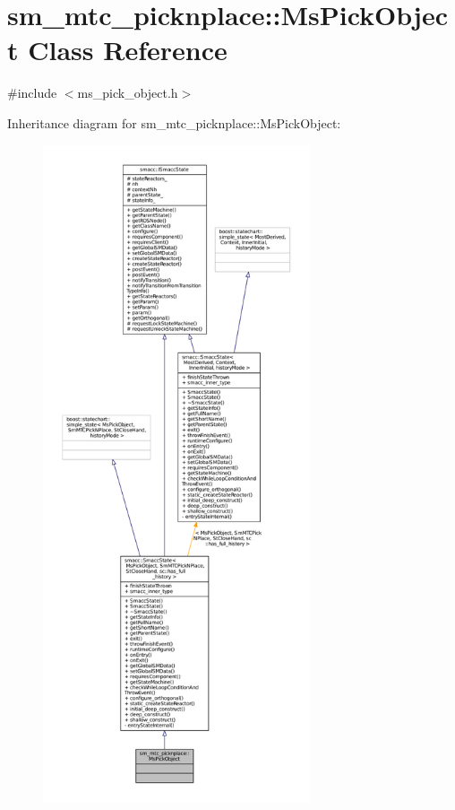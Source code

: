 \hypertarget{classsm__mtc__picknplace_1_1MsPickObject}{}\section{sm\+\_\+mtc\+\_\+picknplace\+:\+:Ms\+Pick\+Object Class Reference}
\label{classsm__mtc__picknplace_1_1MsPickObject}


{\ttfamily \#include $<$ms\+\_\+pick\+\_\+object.\+h$>$}



Inheritance diagram for sm\+\_\+mtc\+\_\+picknplace\+:\+:Ms\+Pick\+Object\+:
\nopagebreak
\begin{figure}[H]
\begin{center}
\leavevmode
\includegraphics[height=550pt]{classsm__mtc__picknplace_1_1MsPickObject__inherit__graph}
\end{center}
\end{figure}


